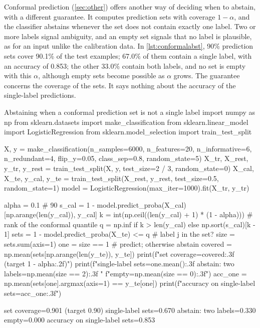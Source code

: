 Conformal prediction (\cref{sec:other}) offers another way of deciding when to abstain, with a
different guarantee. It computes prediction sets with coverage $1-\alpha$, and the classifier abstains whenever the
set does not contain exactly one label. Two or more labels signal ambiguity, and an empty set signals that
no label is plausible, as for an input unlike the calibration data. In \cref{lst:conformalabst}, 90\% prediction sets cover 90.1\%
of the test examples; 67.0\% of them contain a single label, with an accuracy of 0.853; the other
33.0\% contain both labels, and no set is empty with this $\alpha$, although empty sets become possible as $\alpha$
grows. The guarantee concerns the coverage of the sets. It says nothing about the accuracy of the single-label predictions.

\begin{pylisting}[label={lst:conformalabst}]{Abstaining when a conformal prediction set is not a single label}
import numpy as np
from sklearn.datasets import make_classification
from sklearn.linear_model import LogisticRegression
from sklearn.model_selection import train_test_split

X, y = make_classification(n_samples=6000, n_features=20, n_informative=6, n_redundant=4,
                           flip_y=0.05, class_sep=0.8, random_state=5)
X_tr, X_rest, y_tr, y_rest = train_test_split(X, y, test_size=2 / 3, random_state=0)
X_cal, X_te, y_cal, y_te = train_test_split(X_rest, y_rest, test_size=0.5, random_state=1)
model = LogisticRegression(max_iter=1000).fit(X_tr, y_tr)

alpha = 0.1                                                  # 90%
s_cal = 1 - model.predict_proba(X_cal)[np.arange(len(y_cal)), y_cal]
k = int(np.ceil((len(y_cal) + 1) * (1 - alpha)))      # rank of the conformal quantile
q = np.inf if k > len(y_cal) else np.sort(s_cal)[k - 1]
sets = 1 - model.predict_proba(X_te) <= q                    # label j in the set?
size = sets.sum(axis=1)
one = size == 1                                              # predict; otherwise abstain
covered = np.mean(sets[np.arange(len(y_te)), y_te])
print(f"set coverage={covered:.3f} (target {1 - alpha:.2f})")
print(f"single-label sets={one.mean():.3f}  abstain: two labels={np.mean(size == 2):.3f}  "
      f"empty={np.mean(size == 0):.3f}")
acc_one = np.mean(sets[one].argmax(axis=1) == y_te[one])
print(f"accuracy on single-label sets={acc_one:.3f}")
\end{pylisting}
\begin{pyoutput}
set coverage=0.901 (target 0.90)
single-label sets=0.670  abstain: two labels=0.330  empty=0.000
accuracy on single-label sets=0.853
\end{pyoutput}

